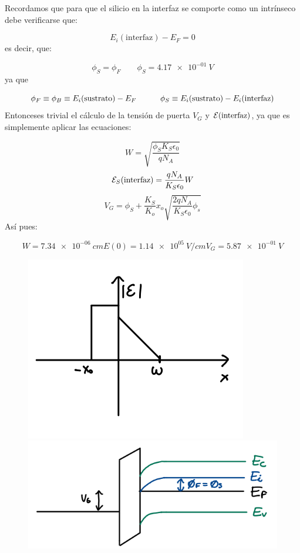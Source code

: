 Recordamos que para que el silicio en la interfaz se comporte como un intrínseco debe verificarse que:

\begin{equation*}
	E_i(\text{interfaz}) - E_F = 0
\end{equation*}
es decir, que:

\begin{equation*}
	\phi_S = \phi_F \qquad
	\phi_{S} = \SI{4.17e-01}{V}
\end{equation*}
ya que

\begin{equation*}
	\phi_F \equiv \phi_B \equiv E_i(\text{sustrato}) - E_F \quad \quad \quad
	\phi_S \equiv E_i(\text{sustrato}) - E_i (\text{interfaz})
\end{equation*}
Entonceses trivial el cálculo de la tensión de puerta $V_G$ y $\mathcal{E}(\text{interfaz})$, ya que es simplemente aplicar las ecuaciones:

\begin{equation*}
	W = \sqrt{\frac{\phi_S K_S \epsilon_0}{qN_A}}
\end{equation*}
\begin{equation*}
	\mathcal{E}_S (\text{interfaz}) = \frac{qN_A}{K_S \epsilon_0}W
\end{equation*}
\begin{equation*}
	V_G = \phi_S + \frac{K_S}{K_o} x_o \sqrt{\frac{2qN_A}{K_S\epsilon_0} \phi_s}
\end{equation*}
Así pues:

\begin{equation*}
	W = \SI{7.34e-06}{cm}
	E(0) = \SI{1.14e+05}{V/cm}
	V_G = \SI{5.87e-01}{V}
\end{equation*}
\begin{figure}[H] \centering
	\includegraphics[width=0.45\linewidth]{Ejercicios/Ch_05/Ej_04_a.png} \hfill
	\includegraphics[width=0.45\linewidth]{Ejercicios/Ch_05/Ej_04_b.png}
\end{figure}

